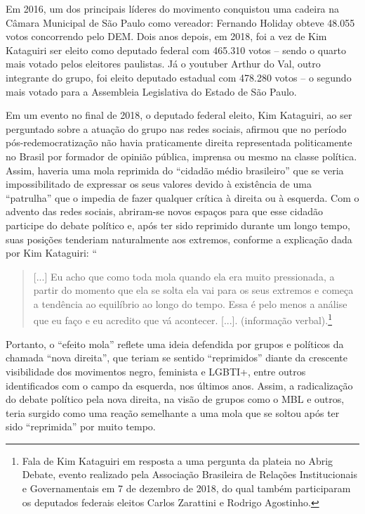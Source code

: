 Em 2016, um dos principais líderes do movimento conquistou uma cadeira
na Câmara Municipal de São Paulo como vereador: Fernando Holiday obteve
48.055 votos concorrendo pelo DEM. Dois anos depois, em 2018, foi a vez
de Kim Kataguiri ser eleito como deputado federal com 465.310 votos --
sendo o quarto mais votado pelos eleitores paulistas. Já o youtuber
Arthur do Val, outro integrante do grupo, foi eleito deputado estadual
com 478.280 votos -- o segundo mais votado para a Assembleia Legislativa
do Estado de São Paulo.

Em um evento no final de 2018, o deputado federal eleito, Kim Kataguiri,
ao ser perguntado sobre a atuação do grupo nas redes sociais, afirmou
que no período pós-redemocratização não havia praticamente direita
representada politicamente no Brasil por formador de opinião pública,
imprensa ou mesmo na classe política. Assim, haveria uma mola reprimida
do ``cidadão médio brasileiro'' que se veria impossibilitado de
expressar os seus valores devido à existência de uma ``patrulha'' que o
impedia de fazer qualquer crítica à direita ou à esquerda. Com o advento
das redes sociais, abriram-se novos espaços para que esse cidadão
participe do debate político e, após ter sido reprimido durante um longo
tempo, suas posições tenderiam naturalmente aos extremos, conforme a
explicação dada por Kim Kataguiri: ``

\begin{quote}
{[}...{]} Eu acho que como toda mola quando ela era muito pressionada, a
partir do momento que ela se solta ela vai para os seus extremos e
começa a tendência ao equilíbrio ao longo do tempo. Essa é pelo menos a
análise que eu faço e eu acredito que vá acontecer. {[}...{]}.
(informação verbal).\footnote{Fala de Kim Kataguiri em resposta a uma
  pergunta da plateia no Abrig Debate, evento realizado pela Associação
  Brasileira de Relações Institucionais e Governamentais em 7 de
  dezembro de 2018, do qual também participaram os deputados federais
  eleitos Carlos Zarattini e Rodrigo Agostinho.}
\end{quote}

Portanto, o ``efeito mola'' reflete uma ideia defendida por grupos e
políticos da chamada ``nova direita'', que teriam se sentido
``reprimidos'' diante da crescente visibilidade dos movimentos negro,
feminista e LGBTI+, entre outros identificados com o campo da esquerda,
nos últimos anos. Assim, a radicalização do debate político pela nova
direita, na visão de grupos como o MBL e outros, teria surgido como uma
reação semelhante a uma mola que se soltou após ter sido ``reprimida''
por muito tempo.

